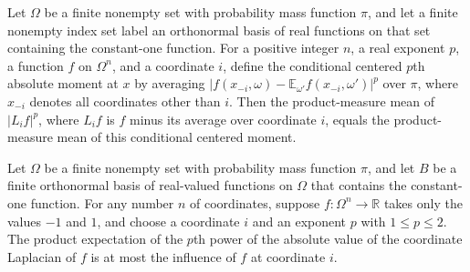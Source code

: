 \begin{theorem}
\label{FABL.FiniteFourierBasis.productMean_abs_laplacian_rpow_eq_conditional}
\leanok
{}
Let $\Omega$ be a finite nonempty set with probability mass function $\pi$, and let a
finite nonempty index set label an orthonormal basis of real functions on that set
containing the constant-one function. For a positive integer $n$, a real exponent $p$, a
function $f$ on $\Omega^n$, and a coordinate $i$, define the conditional centered $p$th
absolute moment at $x$ by averaging
$|f(x_{-i},\omega)-\mathbb{E}_{\omega'}f(x_{-i},\omega')|^p$ over $\pi$, where $x_{-i}$
denotes all coordinates other than $i$. Then the product-measure mean of $|L_i f|^p$,
where $L_i f$ is $f$ minus its average over coordinate $i$, equals the product-measure
mean of this conditional centered moment.
\end{theorem}

\begin{theorem}
\label{FABL.FiniteFourierBasis.productMean_abs_laplacian_rpow_le_influence}
\leanok
{}
Let $\Omega$ be a finite nonempty set with probability mass function $\pi$, and let $B$
be a finite orthonormal basis of real-valued functions on $\Omega$ that contains the
constant-one function. For any number $n$ of coordinates, suppose $f\colon
\Omega^n\to\mathbb R$ takes only the values $-1$ and $1$, and choose a coordinate $i$
and an exponent $p$ with $1\le p\le 2$. The product expectation of the $p$th power of
the absolute value of the coordinate Laplacian of $f$ is at most the influence of $f$ at
coordinate $i$.
\end{theorem}

